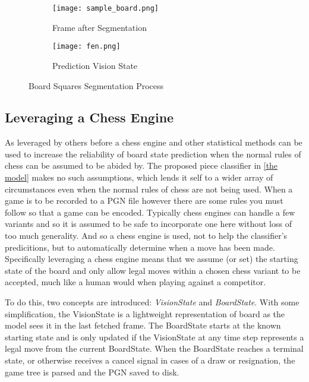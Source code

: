 \begin{figure}[h]
    \centering
    \begin{subfigure}[b]{0.48\textwidth}
        \centering
        \texttt{[image: sample\_board.png]}
        \caption{Frame after Segmentation}
    \end{subfigure}
    \hfill
    \begin{subfigure}[b]{0.48\textwidth}
        \centering
        \texttt{[image: fen.png]}
        \caption{Prediction Vision State}
    \end{subfigure}
\caption{Board Squares Segmentation Process}
\label{fig:visionstate}
\end{figure}

\subsection{Leveraging a Chess Engine}
As leveraged by others before \cite{} a chess engine and other statistical methods \cite{} can be used to increase the reliability of board state 
prediction when the normal rules of chess can be assumed to be abided by.  The proposed piece classifier in \ref{the model} makes no such assumptions, which
lends it self to a wider array of circumstances even when the normal rules of chess are not being used.
When a game is to be recorded to a PGN file however there are some rules you must follow so that a game can be encoded.  Typically chess engines can handle a few
variants and so it is assumed to be safe to incorporate one here without loss of too much generality.  And so a chess engine is used, not to help the 
classifier's predicitions, but to automatically determine when a move has been made.
Specifically leveraging a chess engine means that we assume (or set) the starting state of the board and only allow legal moves within a chosen chess variant to be 
accepted, much like a human would when playing against a competitor.  

To do this, two concepts are introduced: \textit{VisionState} and \textit{BoardState}.  With some simplification, the VisionState is a lightweight 
representation of board as the model sees it in the last fetched frame.  The BoardState starts at the known starting state and is only updated if the VisionState at 
any time step represents a legal move from the current BoardState.  When the BoardState reaches a terminal state, or otherwise receives a cancel signal in cases of a 
draw or resignation, the game tree is parsed and the PGN saved to disk.

